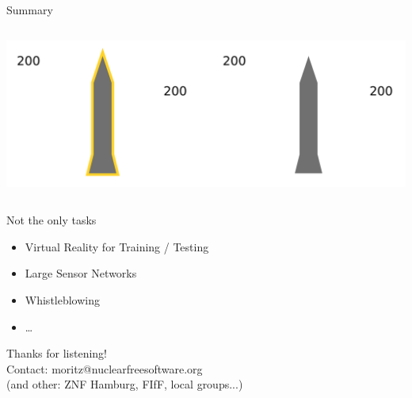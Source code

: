 \documentclass[presentation]{beamer}
\begin{document}
\begin{frame}[label=sec-6-1]{Summary}
\begin{columns}[t]
\begin{column}{0.3\textwidth}
\begin{tcolorbox}[blackheight]
    \includegraphics[width=\textwidth]{images/zkp/measurement_step3}
\end{tcolorbox}

\pause

\vspace{0.5cm}
\end{column}
\end{columns}

\begin{block}{Not the only tasks}
\small
\begin{itemize}
\item Virtual Reality for Training / Testing
\item Large Sensor Networks
\item Whistleblowing
\item \ldots{}
\end{itemize}
\end{block}
\end{frame}

\begin{frame}[label=sec-6-2]{}

\begin{center}
\Large
Thanks for listening!\\[1.5em]
\normalsize
Contact: moritz@nuclearfreesoftware.org\\[2em]
(and other: ZNF Hamburg, FIfF, local groups...)
\end{center}
\end{frame}


\appendix
\end{document}
